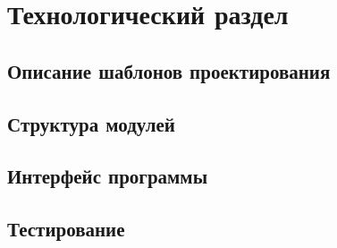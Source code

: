 \chapter{Технологический раздел}
\label{cha:implementation}

\section{Описание шаблонов проектирования}
\section{Структура модулей}
\section{Интерфейс программы}
\section{Тестирование}
